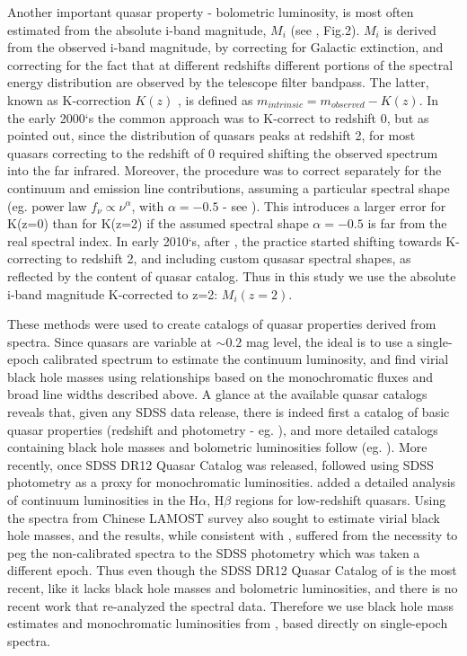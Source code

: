 \documentclass[twocolumn]{aastex62}
\begin{document}
Another important quasar property - bolometric luminosity, is most often estimated from the absolute i-band magnitude, $M_{i}$ (see \citealt{shen2008}, Fig.2). $M_{i}$ is derived from the observed i-band magnitude, by correcting for Galactic extinction, and correcting for the fact that at different redshifts different portions of the spectral energy distribution are observed by the telescope filter bandpass. The latter, known as K-correction $K(z)$ \citep{oke1968},  is defined as $m_{intrinsic} = m_{observed} - K(z)$. In the early 2000`s the common approach was to K-correct to redshift 0, but as \citep{richards2006a} pointed out, since the distribution of quasars peaks at redshift 2, for most quasars correcting to the redshift of 0 required shifting the observed spectrum into the far infrared. Moreover, the procedure was to correct separately for the continuum and emission line contributions, assuming a particular spectral shape (eg. power law  $f_{\nu} \propto \nu^{\alpha}$, with $\alpha=-0.5$ - see \citealt{schneider2010, vandenberk2001, richards2006a}).  This introduces a larger error for K(z=0) than for K(z=2) if the assumed spectral shape $\alpha=-0.5$ is far from the real spectral index. In early 2010`s, after  \citealt{richards2006a, wisotzki2000, blanton2003},  the practice started shifting towards K-correcting to redshift 2,  and including custom qusasar spectral shapes, as reflected by the content of \cite{shen2011} quasar catalog. Thus in this study we use  the absolute i-band magnitude K-corrected to z=2: $M_{i}(z=2)$. %



These methods were used to create catalogs of quasar properties derived from spectra. Since quasars are variable at ${\sim}0.2$ mag level, the ideal is to use a single-epoch calibrated spectrum to estimate the continuum luminosity, and find virial black hole masses using relationships based on the monochromatic fluxes and broad line widths described above. A glance at the available quasar catalogs reveals that, given any SDSS data release, there is indeed first a catalog of basic quasar properties (redshift and photometry - eg. \citealt{schneider2007, schneider2010}), and more detailed catalogs containing black hole masses and bolometric luminosities  follow (eg. \citealt{shen2008, shen2011}). More recently, once SDSS DR12 Quasar Catalog \citep{paris2017} was released,  \citealt{kozlowski2017a} followed using SDSS photometry as a proxy for monochromatic luminosities. \citet{chen2018} added a detailed analysis of continuum luminosities in the  H$\alpha$, H$\beta$ regions for low-redshift quasars. Using the spectra from Chinese LAMOST survey \citet{dong2018} also sought to estimate virial black hole masses, and the results, while consistent with \citet{shen2011}, suffered from the necessity to peg the non-calibrated spectra to the SDSS photometry which was taken  a different epoch. Thus even though the SDSS DR12 Quasar Catalog of \cite{paris2018}  is the most recent, like \citet{paris2017} it lacks black hole masses and bolometric luminosities, and there is no recent work that re-analyzed the spectral data. Therefore we use black hole mass estimates and monochromatic luminosities from \citet{shen2011}, based directly on single-epoch spectra. 
\end{document}
